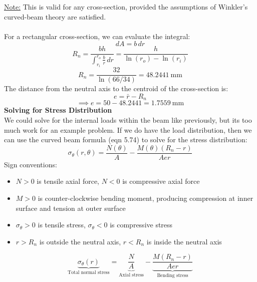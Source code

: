\documentclass[11pt]{article}
\begin{document}
\underline{Note:} This is valid for any cross-section, provided the assumptions of Winkler's curved-beam theory are satisfied.\\\\
For a rectangular cross-section, we can evaluate the integral:
\[dA = b \, dr\]
\[
R_n=\frac{bh}{\displaystyle\int_{r_i}^{r_o}\frac{b}{r}\,dr}=\frac{h}{\ln(r_o)-\ln(r_i)}
\]
\[
R_n=\frac{32}{\ln(66/34)}
=48.2441\ \mathrm{mm}
\]
The distance from the neutral axis to the centroid of the cross-section is:
\[\boxed{e = \bar{r} - R_n}\]
\[\implies 
e=50-48.2441=1.7559\ \mathrm{mm}
\]
\textbf{Solving for Stress Distribution}\\
We could solve for the internal loads within the beam like previously, but its too much work for an example problem. If we do have the load distribution, then we can use the curved beam formula (eqn 5.74) to solve for the stress distribution:
\[
\boxed{\sigma_\theta(r,\theta)=\frac{N(\theta)}{A}-\frac{M(\theta)(R_n-r)}{Aer}}
\]
Sign conventions:
\begin{itemize}
    \item $N>0$ is tensile axial force, $N<0$ is compressive axial force
    \item $M>0$ is counter-clockwise bending moment, producing compression at inner surface and tension at outer surface
    \item $\sigma_\theta>0$ is tensile stress, $\sigma_\theta<0$ is compressive stress
    \item $r>R_n$ is outside the neutral axis, $r<R_n$ is inside the neutral axis
\end{itemize}
\[
\underbrace{\sigma_\theta(r)}_{\text{Total normal stress}}
=
\underbrace{\frac{N}{A}}_{\text{Axial stress}}
-
\underbrace{\frac{M(R_n-r)}{Aer}}_{\text{Bending stress}}
\]
\end{document}
